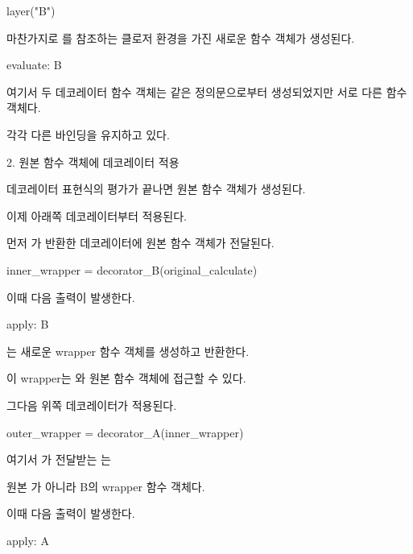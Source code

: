 \begin{dhkcode}
layer("B")
\end{dhkcode}

마찬가지로 를 참조하는 클로저 환경을 가진 새로운  함수 객체가 생성된다.

\begin{dhkzsh}
evaluate: B
\end{dhkzsh}

여기서 두 데코레이터 함수 객체는 같은  정의문으로부터 생성되었지만 서로 다른 함수 객체다.

각각 다른  바인딩을 유지하고 있다.

\begin{dhknote}
\begin{dhksmry}[centered]
2. 원본 함수 객체에 데코레이터 적용
\end{dhksmry}
\end{dhknote}

데코레이터 표현식의 평가가 끝나면 원본  함수 객체가 생성된다.

이제 아래쪽 데코레이터부터 적용된다.

먼저 가 반환한 데코레이터에 원본 함수 객체가 전달된다.

\begin{dhkcode}
inner_wrapper = decorator_B(original_calculate)
\end{dhkcode}

이때 다음 출력이 발생한다.

\begin{dhkzsh}
apply: B
\end{dhkzsh}

는 새로운 wrapper 함수 객체를 생성하고 반환한다.

이 wrapper는 와 원본  함수 객체에 접근할 수 있다.

그다음 위쪽 데코레이터가 적용된다.

\begin{dhkcode}
outer_wrapper = decorator_A(inner_wrapper)
\end{dhkcode}

여기서 가 전달받는 는 

원본 가 아니라 B의 wrapper 함수 객체다.

이때 다음 출력이 발생한다.

\begin{dhkzsh}
apply: A
\end{dhkzsh}

